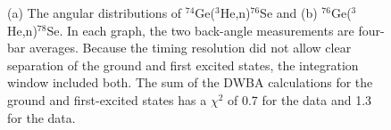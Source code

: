\begin{figure}[!htbp]
\centering
{}
\caption[The angular distributions of $^{74}$Ge($^3$He,n)$^{76}$Se and $^{76}$Ge($^3$He,n)$^{78}$Se.]{(a) The angular distributions of $^{74}$Ge($^3$He,n)$^{76}$Se and (b) $^{76}$Ge($^3$He,n)$^{78}$Se.  In each graph, the two back-angle measurements are four-bar averages.  Because the timing resolution did not allow clear separation of the ground and first excited states, the integration window included both.  The sum of the DWBA calculations for the ground and first-excited states has a $\chi^2$ of 0.7 for the  data and 1.3 for the  data.}
\label{fig:PS_angularDistribution}
\end{figure}
 
